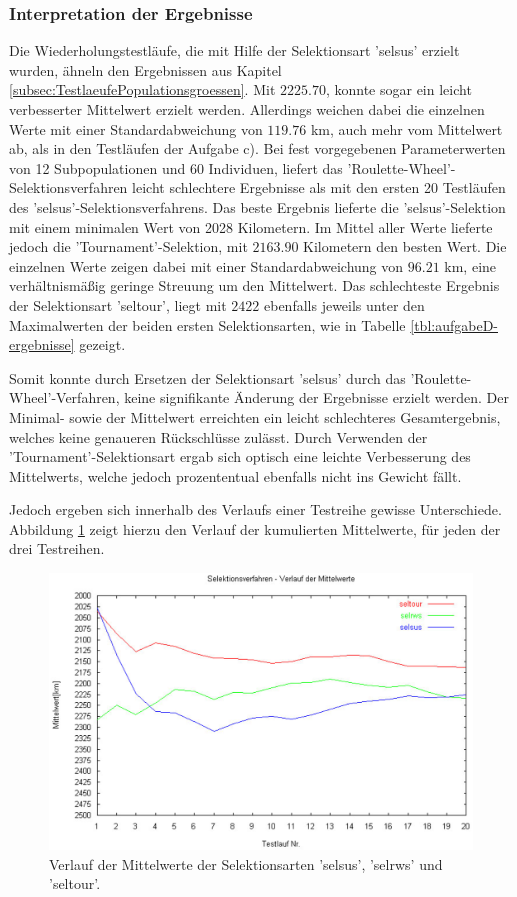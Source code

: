 \subsubsection{Interpretation der Ergebnisse}
Die Wiederholungstestläufe, die mit Hilfe der Selektionsart 'selsus' erzielt
wurden, ähneln  den Ergebnissen aus Kapitel \ref{subsec:TestlaeufePopulationsgroessen}.
Mit $2225.70$, konnte sogar ein leicht verbesserter Mittelwert erzielt werden. Allerdings
weichen dabei die einzelnen Werte mit einer Standardabweichung von $119.76$ km,
auch mehr vom Mittelwert ab, als in den Testläufen der Aufgabe c). Bei fest
vorgegebenen Parameterwerten von 12 Subpopulationen und 60 Individuen, liefert
das 'Roulette-Wheel'-Selektionsverfahren leicht schlechtere Ergebnisse als mit den
ersten 20 Testläufen des 'selsus'-Selektionsverfahrens. Das beste Ergebnis
lieferte die 'selsus'-Selektion mit einem minimalen Wert von 2028 Kilometern.
Im Mittel aller Werte lieferte jedoch die 'Tournament'-Selektion, mit $2163.90$ Kilometern
den besten Wert. Die einzelnen Werte zeigen dabei mit einer Standardabweichung von $96.21$ km,
eine verhältnismäßig geringe Streuung um den Mittelwert. Das schlechteste Ergebnis der
Selektionsart 'seltour', liegt mit $2422$ ebenfalls jeweils unter den Maximalwerten
der beiden ersten Selektionsarten, wie in Tabelle \ref{tbl:aufgabeD-ergebnisse}
gezeigt.
  
Somit konnte durch Ersetzen der Selektionsart 'selsus' durch das
'Roulette-Wheel'-Verfahren, keine signifikante Änderung der Ergebnisse erzielt
werden. Der Minimal- sowie der Mittelwert erreichten ein leicht schlechteres
Gesamtergebnis, welches keine genaueren Rückschlüsse zulässt. Durch Verwenden der 
'Tournament'-Selektionsart ergab sich optisch eine leichte Verbesserung des
Mittelwerts, welche jedoch prozententual ebenfalls nicht ins Gewicht fällt. 

Jedoch ergeben sich innerhalb des Verlaufs einer Testreihe gewisse Unterschiede.
Abbildung \ref{fig:aufgabeDMittelwerte} zeigt hierzu den Verlauf der kumulierten
Mittelwerte, für jeden der drei Testreihen.

\begin{figure} 
  \centering
  \includegraphics[width=1.0\textwidth]{../images/picMittelverlaufSelections}
  \caption{Verlauf der Mittelwerte der Selektionsarten 'selsus', 'selrws' und 'seltour'.}
  \label{fig:aufgabeDMittelwerte}
\end{figure}

